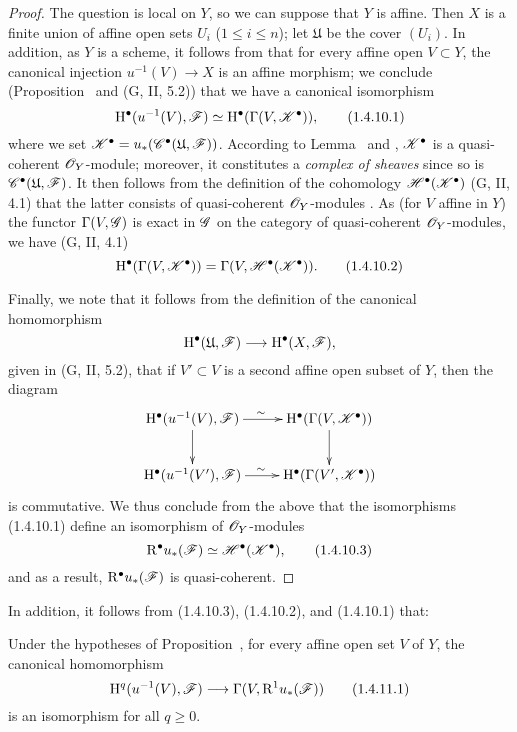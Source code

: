 \begin{proof}
\label{proof-3.1.4.10}
The question is local on $Y$, so we can suppose that $Y$ is affine.
Then $X$ is a finite union of affine open sets $U_i$ ($1\leq i\leq n$); let $\mathfrak{U}$ be the cover $(U_i)$.
In addition, as $Y$ is a scheme, it follows from  that for every affine open $V\subset Y$, the canonical injection $u^{-1}(V)\to X$ is an affine morphism; we conclude (Proposition~ and (G, II, 5.2)) that we have a canonical isomorphism
\[
  \mathrm{H}^\bullet(u^{-1}(V),\mathscr{F})\simeq\mathrm{H}^\bullet(\Gamma(V,\mathscr{K}^\bullet)),
  \tag{1.4.10.1}
\]
where we set $\mathscr{K}^\bullet=u_*(\mathscr{C}^\bullet(\mathfrak{U},\mathscr{F}))$.
According to Lemma~ and , $\mathscr{K}^\bullet$ is a quasi-coherent $\mathscr{O}_Y$-module; moreover, it constitutes a \emph{complex of sheaves} since so is $\mathscr{C}^\bullet(\mathfrak{U},\mathscr{F})$.
It then follows from the definition of the cohomology $\mathscr{H}^\bullet(\mathscr{K}^\bullet)$ (G, II, 4.1) that the latter consists of quasi-coherent $\mathscr{O}_Y$-modules .
As (for $V$ affine in $Y$) the functor $\Gamma(V,\mathscr{G})$ is exact in $\mathscr{G}$ on the category of quasi-coherent $\mathscr{O}_Y$-modules, we have (G, II, 4.1)
\[
  \mathrm{H}^\bullet(\Gamma(V,\mathscr{K}^\bullet))=\Gamma(V,\mathscr{H}^\bullet(\mathscr{K}^\bullet)).
  \tag{1.4.10.2}
\]

Finally, we note that it follows from the definition of the canonical homomorphism
\[
  \HH^\bullet(\mathfrak{U},\sh{F})\to\HH^\bullet(X,\sh{F}),
\]
given in (G, II, 5.2), that if $V'\subset V$ is a second affine open subset of $Y$, then the
diagram
\[
  \xymatrix{
    \HH^\bullet(u^{-1}(V),\sh{F})\ar[r]^\sim\ar[d] &
    \HH^\bullet(\Gamma(V,\sh{K}^\bullet))\ar[d]\\
    \HH^\bullet(u^{-1}(V'),\sh{F})\ar[r]^\sim &
    \HH^\bullet(\Gamma(V',\sh{K}^\bullet))
  }
\]
is commutative.
We thus conclude from the above that the isomorphisms (1.4.10.1) define an isomorphism of $\mathscr{O}_Y$-modules
\[
  \mathrm{R}^\bullet u_*(\mathscr{F})\simeq\mathscr{H}^\bullet(\mathscr{K}^\bullet),
  \tag{1.4.10.3}
\]
and as a result, $\mathrm{R}^\bullet u_*(\mathscr{F})$ is quasi-coherent.
\end{proof}

In addition, it follows from (1.4.10.3), (1.4.10.2), and (1.4.10.1) that:
\begin{corollary}[1.4.11]
\label{3.1.4.11}
Under the hypotheses of Proposition~, for every affine open set $V$ of $Y$, the canonical homomorphism
\[
  \HH^q(u^{-1}(V),\sh{F})\to\Gamma(V,\RR^1 u_*(\sh{F}))
  \tag{1.4.11.1}
\]
is an isomorphism for all $q\geq 0$.
\end{corollary}

